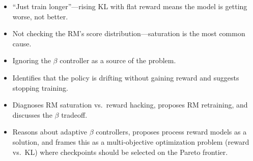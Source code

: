 \begin{interviewq}
\redflags
\begin{itemize}
    \item ``Just train longer''---rising KL with flat reward means the model is getting worse, not better.
    \item Not checking the RM's score distribution---saturation is the most common cause.
    \item Ignoring the $\beta$ controller as a source of the problem.
\end{itemize}


\goodgreat
\begin{itemize}
    \item {} Identifies that the policy is drifting without gaining reward and suggests stopping training.
    \item {} Diagnoses RM saturation vs.\ reward hacking, proposes RM retraining, and discusses the $\beta$ tradeoff.
    \item {} Reasons about adaptive $\beta$ controllers, proposes process reward models as a solution, and frames this as a multi-objective optimization problem (reward vs.\ KL) where checkpoints should be selected on the Pareto frontier.
\end{itemize}

\end{interviewq}


